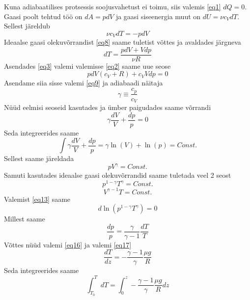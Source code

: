 \documentclass{trkut}%
\begin{document}
Kuna adiabaatilises protsessis soojusvahetust ei toimu, siis valemis \ref{eq1} $dQ=0$. Gaasi poolt tehtud töö on $d A=pdV$ ja gaasi siseenergia muut on $dU=\nu c_VdT$. Sellest järeldub
\begin{equation}\label{eq2}
\nu c_VdT = -pdV
\end{equation}
Ideaalse gaasi olekuvõrrandist \ref{eq8} saame tuletist võttes ja avaldades järgneva
\begin{equation}\label{eq3}
dT = \frac{pdV+Vdp}{\nu R}
\end{equation}
Asendades \ref{eq3} valemi valemisse \ref{eq2} saame uue seose
\begin{equation}\label{eq4}
pdV(c_V+R)+c_VVdp=0
\end{equation}
Asendame siia sisse valemi \ref{eq9} ja adiabaadi näitaja
\begin{equation*}
\gamma \equiv \frac{c_p}{c_V}
\end{equation*}
Nüüd eelmisi seoseid kasutades ja ümber paigudades saame võrrandi
\begin{equation*}
\gamma \frac{dV}{V} + \frac{dp}{p} = 0
\end{equation*}
Seda integreerides saame
\begin{equation*}
 \int \gamma \frac{dV}{V} + \frac{dp}{p} = \gamma \ln(V) + \ln(p) = Const.
\end{equation*}
Sellest saame järeldada
\begin{equation*}
pV^\gamma = Const.
\end{equation*}
Samuti kasutades ideaalse gaasi olekuvõrrandid saame tuletada veel 2 seost
\begin{equation}\label{eq13}
p^{1-\gamma}T^\gamma = Const.
\end{equation}
\begin{equation*}
V^{\gamma-1}T = Const.
\end{equation*}
Valemist \ref{eq13} saame
\begin{equation*}
d\ln(p^{1-\gamma}T^\gamma) = 0
\end{equation*}
Millest saame
\begin{equation}\label{eq17}
\frac{dp}{p} = \frac{\gamma}{\gamma-1}\frac{dT}{T}
\end{equation}
Võttes nüüd valemi \ref{eq16} ja valemi \ref{eq17}
\begin{equation*}
\frac{dT}{dz}=-\frac{\gamma-1}{\gamma} \frac{\mu g}{R}
\end{equation*}
Seda integreerides saame
\begin{equation*}
\int_{T_0}^{T} dT = \int_{0}^{z} -\frac{\gamma-1}{\gamma} \frac{\mu g}{R} dz
\end{equation*}
\end{document}

